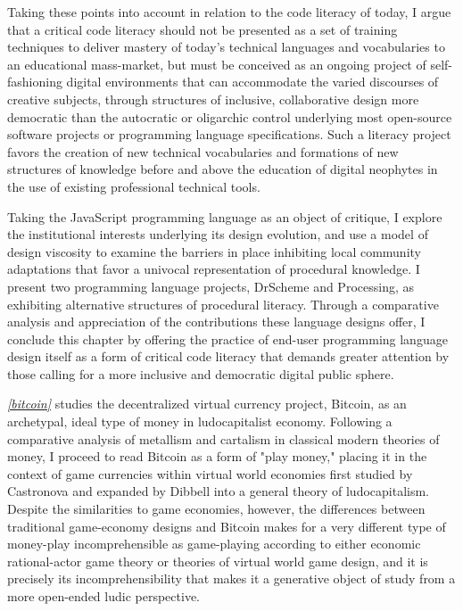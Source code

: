 Taking these points into account in relation to the code literacy of today, I argue that a critical code literacy should not be presented as a set of training techniques to deliver mastery of today's technical languages and vocabularies to an educational mass-market, but must be conceived as an ongoing project of self-fashioning digital environments that can accommodate the varied discourses of creative subjects, through structures of inclusive, collaborative design more democratic than the autocratic or oligarchic control underlying most open-source software projects or programming language specifications. Such a literacy project favors the creation of new technical vocabularies and formations of new structures of knowledge before and above the education of digital neophytes in the use of existing professional technical tools.

Taking the JavaScript programming language as an object of critique, I explore the institutional interests underlying its design evolution, and use a model of design viscosity to examine the barriers in place inhibiting local community adaptations that favor a univocal representation of procedural knowledge. I present two programming language projects, DrScheme and Processing, as exhibiting alternative structures of procedural literacy. Through a comparative analysis and appreciation of the contributions these language designs offer, I conclude this chapter by offering the practice of end-user programming language design itself as a form of critical code literacy that demands greater attention by those calling for a more inclusive and democratic digital public sphere.

\emph{\cref{bitcoin}} studies the decentralized virtual currency project, Bitcoin, as an archetypal, ideal type of money in ludocapitalist economy. Following a comparative analysis of metallism and cartalism in classical modern theories of money, I proceed to read Bitcoin as a form of "play money," placing it in the context of game currencies within virtual world economies first studied by Castronova and expanded by Dibbell into a general theory of ludocapitalism. Despite the similarities to game economies, however, the differences between traditional game-economy designs and Bitcoin makes for a very different type of money-play incomprehensible as game-playing according to either economic rational-actor game theory or theories of virtual world game design, and it is precisely its incomprehensibility that makes it a generative object of study from a more open-ended ludic perspective.


